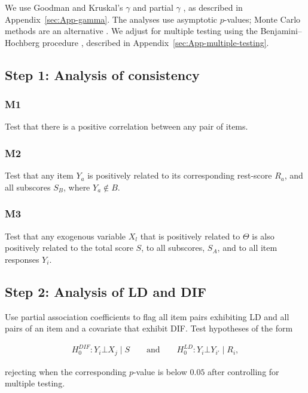\documentclass[12pt]{article}
\theoremstyle{examplestyle}
\begin{document}
We use Goodman and Kruskal's $\gamma$ \citeyearpar{goodman-kruskal-1954} and partial $\gamma$ \citep{davis-1967}, as described in Appendix~\ref{sec:App-gamma}. The analyses use asymptotic $p$-values; Monte Carlo methods are an alternative \citep{north-2002}. We adjust for multiple testing using the Benjamini--Hochberg procedure \citeyearpar{benjamini-hochberg-1995}, described in Appendix~\ref{sec:App-multiple-testing}.

\subsection{Step 1: Analysis of consistency}

\subsubsection{M1} 

Test that there is a positive correlation between any pair of items. 

\subsubsection{M2} 

Test that any item $Y_a$ is positively related to its corresponding rest-score $R_a$, and all subscores $S_B$, where $Y_a\not\in B$.

\subsubsection{M3} 

Test that any exogenous variable $X_l$ that is positively related to $\Theta$ is also positively related to the total score $S$, to all subscores, $S_A$, and to all item responses $Y_i$.

\subsection{Step 2: Analysis of LD and DIF}\label{sec:ld-dif}

Use partial association coefficients to flag all item pairs exhibiting LD and all pairs of an item and a covariate that exhibit DIF. Test hypotheses of the form

\begin{align*}
    H_0^{DIF}: Y_i \bot X_j  \mid S \qquad \text{and} \qquad H_0^{LD}:Y_i \bot Y_{i'} \mid R_i,
\end{align*}

rejecting when the corresponding $p$-value is below $0.05$ after controlling for multiple testing.
\end{document}
